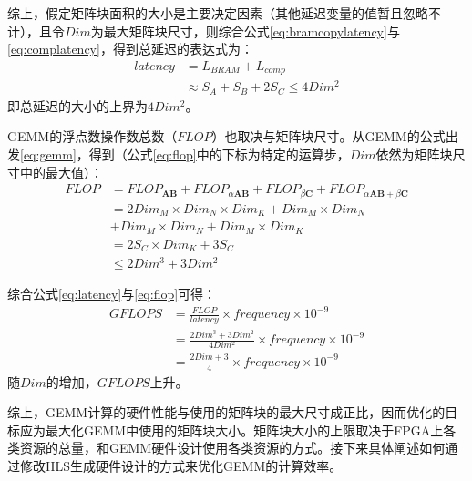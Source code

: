 综上，假定矩阵块面积的大小是主要决定因素（其他延迟变量的值暂且忽略不计），且令\(\mathit{Dim}\)为最大矩阵块尺寸，则综合公式\ref{eq:bramcopylatency}与\ref{eq:complatency}，得到总延迟的表达式为：
\begin{equation}\label{eq:latency}
\begin{aligned}
\mathit{latency} 
& = \mathit{L_{BRAM}} + \mathit{L_{comp}} \\
& \approx \mathit{S_A + S_B + 2S_C} \leq 4Dim^2
\end{aligned}
\end{equation}
即总延迟的大小的上界为\(\mathit{4Dim^2}\)。

GEMM的浮点数操作数总数（\(\mathit{FLOP}\)）也取决与矩阵块尺寸。从GEMM的公式出发\ref{eq:gemm}，得到（公式\ref{eq:flop}中的下标为特定的运算步，\(\mathit{Dim}\)依然为矩阵块尺寸中的最大值）：
\begin{equation}\label{eq:flop}
\begin{aligned}
\mathit{FLOP} 
& = \mathit{FLOP_{\mathbf{AB}}} 
  + \mathit{FLOP_{\alpha\mathbf{AB}}}
  + \mathit{FLOP_{\beta\mathbf{C}}}
  + \mathit{FLOP_{\alpha\mathbf{AB}+\beta\mathbf{C}}} \\
& = \mathit{2 Dim_M\times Dim_N\times Dim_K + Dim_M \times Dim_N} \\
& + \mathit{Dim_M \times Dim_N + Dim_M \times Dim_K} \\
& = \mathit{2 S_C \times Dim_K + 3 S_C} \\
& \leq \mathit{2 Dim^3 + 3 Dim^2}
\end{aligned}
\end{equation}

综合公式\ref{eq:latency}与\ref{eq:flop}可得：
\begin{equation}\label{eq:gflops}
\begin{aligned}
\mathit{GFLOPS}
& = \mathit{\frac{FLOP}{latency} \times frequency \times 10^{-9}} \\
& = \mathit{\frac{2 Dim^3 + 3 Dim ^ 2}{4 Dim^2}\times frequency \times 10^{-9}} \\
& = \mathit{\frac{2 Dim + 3}{4} \times frequency \times 10^{-9}}
\end{aligned}
\end{equation}
随$\mathit{Dim}$的增加，$\mathit{GFLOPS}$上升。

综上，GEMM计算的硬件性能与使用的矩阵块的最大尺寸成正比，因而优化的目标应为最大化GEMM中使用的矩阵块大小。矩阵块大小的上限取决于FPGA上各类资源的总量，和GEMM硬件设计使用各类资源的方式。接下来具体阐述如何通过修改HLS生成硬件设计的方式来优化GEMM的计算效率。

